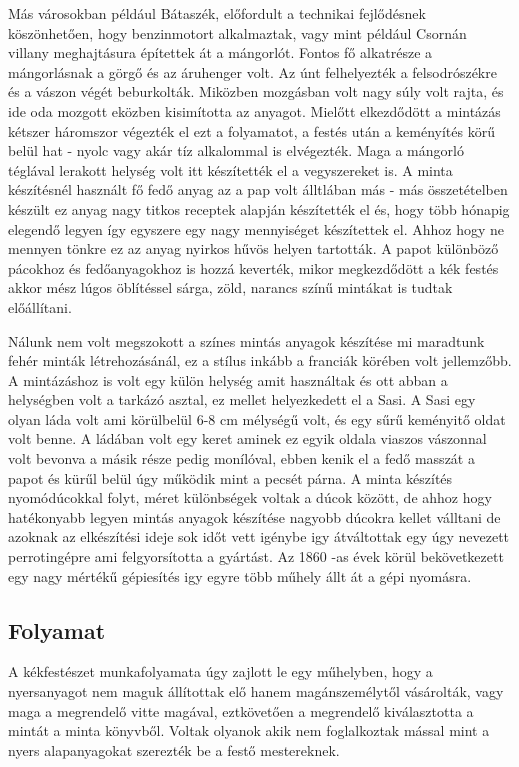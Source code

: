 \documentclass[fontsize=12pt, appendixprefix=true]{scrreprt}
\begin{document}
Más városokban például Bátaszék, előfordult a technikai fejlődésnek köszönhetően, hogy benzinmotort alkalmaztak, vagy mint például Csornán villany meghajtásura építettek át a mángorlót. Fontos fő alkatrésze a mángorlásnak a görgő és az áruhenger volt. Az únt felhelyezték a felsodrószékre és a vászon végét beburkolták. Miközben mozgásban volt nagy súly volt rajta, és ide oda mozgott eközben kisimította az anyagot. Mielőtt elkezdődött a mintázás kétszer háromszor végezték el ezt a folyamatot, a festés után a keményítés körű belül hat - nyolc  vagy akár tíz alkalommal is elvégezték. Maga a mángorló téglával lerakott helység volt itt készítették el a vegyszereket is. 
A minta készítésnél használt fő fedő anyag az a pap volt álltlában más - más összetételben készült ez anyag nagy titkos receptek alapján készítették el és, hogy több hónapig elegendő legyen így egyszere egy nagy mennyiséget készítettek el.  Ahhoz hogy ne mennyen tönkre ez az anyag nyirkos hűvös helyen tartották. A papot különböző  pácokhoz és fedőanyagokhoz is hozzá keverték, mikor megkezdődött a kék festés akkor mész lúgos öblítéssel sárga, zöld, narancs színű mintákat is tudtak előállítani.

Nálunk nem volt megszokott a  színes mintás anyagok készítése mi maradtunk fehér minták létrehozásánál, ez a stílus inkább a franciák körében volt jellemzőbb. A mintázáshoz is volt egy külön helység amit használtak és ott abban a helységben volt a tarkázó asztal, ez mellet helyezkedett el a Sasi.
A Sasi egy olyan láda volt ami körülbelül 6-8 cm mélységű volt, és egy sűrű keményitő oldat volt benne. A ládában volt egy keret aminek ez egyik oldala viaszos vászonnal volt bevonva a másik része pedig monílóval, ebben kenik el a fedő masszát a papot és kürűl belül úgy működik mint a pecsét párna.
A minta készítés nyomódúcokkal folyt, méret különbségek voltak a dúcok között, de ahhoz hogy hatékonyabb legyen mintás anyagok készítése nagyobb dúcokra kellet válltani de azoknak az elkészítési ideje sok időt vett igénybe igy átváltottak egy úgy nevezett perrotingépre ami  felgyorsította a gyártást. Az 1860 -as évek körül bekövetkezett egy nagy mértékű gépiesítés igy egyre több műhely állt át a gépi nyomásra.

\subsection{Folyamat}

A kékfestészet munkafolyamata úgy zajlott le egy műhelyben, hogy a nyersanyagot nem maguk állítottak elő hanem magánszemélytől vásárolták,  vagy maga a megrendelő vitte magával, eztkövetően a megrendelő kiválasztotta a mintát a minta könyvből. 
Voltak olyanok akik nem foglalkoztak mással mint a nyers alapanyagokat szerezték be a festő mestereknek.
\end{document}
